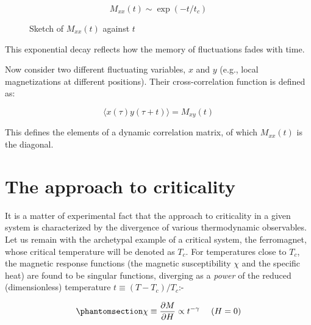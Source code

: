 \documentclass[
  letterpaper,
  DIV=11,
  numbers=noendperiod]{scrreprt}
\begin{document}
\[
M_{xx}(t) \sim \exp(-t / t_c)
\]

\begin{figure}


\caption{\label{fig-Mxx}Sketch of \(M_{xx}(t)\) against \(t\)}

\end{figure}%

This exponential decay reflects how the memory of fluctuations fades
with time.

Now consider two different fluctuating variables, \(x\) and \(y\) (e.g.,
local magnetizations at different positions). Their cross-correlation
function is defined as:

\[
\langle x(\tau) y(\tau + t) \rangle = M_{xy}(t)
\]

This defines the elements of a dynamic correlation matrix, of which
\(M_{xx}(t)\) is the diagonal.

\chapter{The approach to criticality}\label{sec:approach}

It is a matter of experimental fact that the approach to criticality in
a given system is characterized by the divergence of various
thermodynamic observables. Let us remain with the archetypal example of
a critical system, the ferromagnet, whose critical temperature will be
denoted as \(T_c\). For temperatures close to \(T_c\), the magnetic
response functions (the magnetic susceptibility \(\chi\) and the
specific heat) are found to be singular functions, diverging as a
\emph{power} of the reduced (dimensionless) temperature \(t \equiv
(T-T_c)/T_c\):-

\begin{equation}\phantomsection\label{eq-chipow}{
\chi \equiv \frac{\partial M}{\partial H}\propto t^{-\gamma} ~~~~ (H=0) 
}\end{equation}
\end{document}
